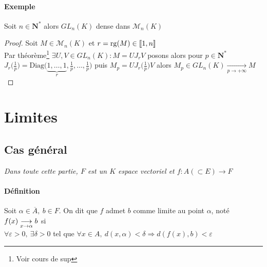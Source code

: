 		
		\paragraph{Exemple} 
			Soit $n\in\mathbf{N}^*$ alors $GL_n(K)$ dense dans $\mathcal{M}_n (K)$
			
			\begin{proof} Soit $M \in \mathcal{M}_n (K)$ et $r=\mathrm{rg}(M) \in {\llbracket 1,n \rrbracket}$ \\
			Par théorème\footnote[1]{Voir cours de sup} $\exists U,V \in GL_n(K) :M=UJ_rV$ posons alors pour $p\in\mathbf{N}^*$ $J_r\big(\frac{1}{p}\bigr) = 
			\mathrm{Diag}\bigl(\underbrace{1,\dots ,1}_r,\frac{1}{p} ,\dots ,\frac{1}{p}\bigr)$ puis $M_p = UJ_r\bigl(\frac{1}{p}\bigr) V$ alors $M_p \in GL_n(K)\underset{p\rightarrow +\infty}{\longrightarrow} M$
			\end{proof} \medskip
		
		
\section{Limites}

	\subsection{Cas général}
		
		\textit{Dans toute cette partie, $F$ est un $K$ espace vectoriel et $f:A(\subset E) \rightarrow F$} 
		
		\vspace{-15pt}
		\traitd
		\paragraph{Définition}
			Soit $\alpha \in \overline{A} ,~ b\in F$. On dit que $f$ admet $b$ comme limite au point $\alpha$, noté $f(x)\underset{x \to \alpha}{\longrightarrow} b$ si\\
			$\forall \varepsilon >0 ,~\exists \delta >0$ tel que $\forall x\in A , ~ d(x,\alpha )<\delta \Rightarrow d(f(x) , b)<\varepsilon$
		\trait
		
		 \medskip
		
